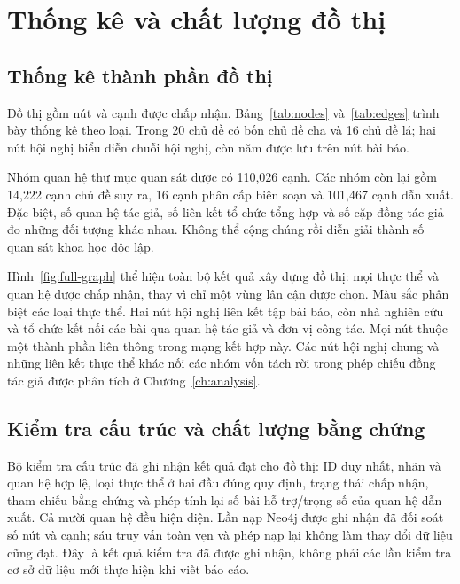\chapter{Thống kê và chất lượng đồ thị}
\label{ch:quality}
\section{Thống kê thành phần đồ thị}
Đồ thị gồm \TotalNodes{} nút và \TotalEdges{} cạnh được chấp nhận.
Bảng~\ref{tab:nodes} và~\ref{tab:edges} trình bày thống kê theo loại. Trong
20 chủ đề có bốn chủ đề cha và 16 chủ đề lá; hai nút hội nghị biểu diễn chuỗi
hội nghị, còn năm được lưu trên nút bài báo.



\FloatBarrier

Nhóm quan hệ thư mục quan sát được có 110,026 cạnh. Các nhóm còn lại gồm
14,222 cạnh chủ đề suy ra, 16 cạnh phân cấp biên soạn và 101,467 cạnh dẫn xuất.
Đặc biệt, số quan hệ tác giả, số liên kết tổ chức tổng hợp và số cặp đồng tác
giả đo những đối tượng khác nhau. Không thể cộng chúng rồi diễn giải thành số
quan sát khoa học độc lập.


Hình~\ref{fig:full-graph} thể hiện toàn bộ kết quả xây dựng đồ thị: mọi thực
thể và quan hệ được chấp nhận, thay vì chỉ một vùng lân cận được chọn. Màu sắc
phân biệt các loại thực thể. Hai nút hội nghị liên kết tập bài báo, còn nhà
nghiên cứu và tổ chức kết nối các bài qua quan hệ tác giả và đơn vị công tác.
Mọi nút thuộc một thành phần liên thông trong mạng kết hợp này. Các nút hội
nghị chung và những liên kết thực thể khác nối các nhóm vốn tách rời trong
phép chiếu đồng tác giả được phân tích ở Chương~\ref{ch:analysis}.

\FloatBarrier
\clearpage

\Needspace{15cm}
\section{Kiểm tra cấu trúc và chất lượng bằng chứng}
Bộ kiểm tra cấu trúc đã ghi nhận kết quả đạt cho đồ thị: ID duy nhất, nhãn và quan
hệ hợp lệ, loại thực thể ở hai đầu đúng quy định, trạng thái chấp nhận, tham
chiếu bằng chứng và phép tính lại số bài hỗ trợ/trọng số của quan hệ dẫn xuất.
Cả mười quan hệ đều hiện diện. Lần nạp Neo4j được ghi nhận đã đối soát số nút
và cạnh; sáu truy vấn toàn vẹn và phép nạp lại không làm thay đổi dữ liệu cũng
đạt. Đây là kết quả kiểm tra đã được ghi nhận, không phải các lần kiểm tra cơ sở dữ
liệu mới thực hiện khi viết báo cáo.

